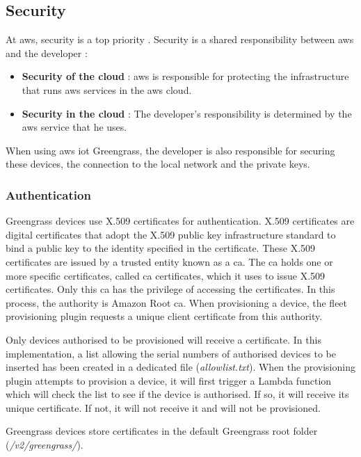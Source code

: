 \subsection{Security}
At \gls{aws}, security is a top priority \cite{aws_iot_greengrass_security}. Security is a shared responsibility between \gls{aws} and the developer :
\begin{itemize}
    \item \textbf{Security of the \gls{cloud}} : \gls{aws} is responsible for protecting the infrastructure that runs \gls{aws} services in the \gls{aws} \gls{cloud}.
    \item \textbf{Security in the \gls{cloud}} : The developer's responsibility is determined by the \gls{aws} service that he uses.
\end{itemize}
When using \gls{aws} \acrshort{iot} Greengrass, the developer is also responsible for securing these devices, the connection to the local network and the private keys.

\subsubsection{Authentication}
Greengrass devices use X.509 certificates for authentication. X.509 certificates are digital certificates that adopt the X.509 public key infrastructure standard to bind a public key to the identity specified in the certificate. These X.509 certificates are issued by a trusted entity known as a \acrfull{ca}. The \acrshort{ca} holds one or more specific certificates, called \acrshort{ca} certificates, which it uses to issue X.509 certificates. Only this \acrshort{ca} has the privilege of accessing the certificates. In this process, the authority is Amazon Root \acrlong{ca}. When \gls{provisioning} a device, the fleet \gls{provisioning} plugin requests a unique client certificate from this authority. \cite{aws_iot_greengrass_security}

Only devices authorised to be provisioned will receive a certificate. In this implementation, a list allowing the serial numbers of authorised devices to be inserted has been created in a dedicated file (\textit{allowlist.txt}). When the \gls{provisioning} plugin attempts to provision a device, it will first trigger a Lambda function which will check the list to see if the device is authorised. If so, it will receive its unique certificate. If not, it will not receive it and will not be provisioned.

Greengrass devices store certificates in the default Greengrass root folder (\textit{/v2/greengrass/}).

